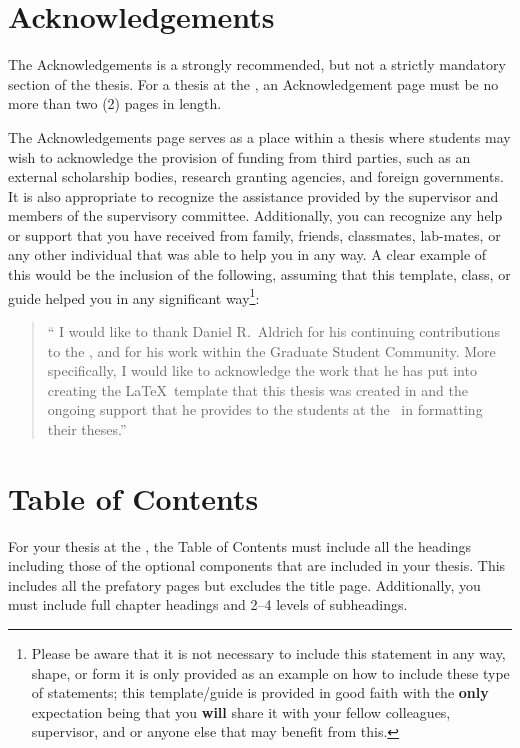 	\section{Acknowledgements}

		The Acknowledgements is a strongly recommended, but not a strictly mandatory section of the thesis.
		For a thesis at the \University, an Acknowledgement page must be no more than two (2) pages in length.

		The Acknowledgements page serves as a place within a thesis where students may wish to acknowledge the provision of funding from third parties, such as an external scholarship bodies, research granting agencies, and foreign governments. 
		It is also appropriate to recognize the assistance provided by the supervisor and members of the supervisory committee.
		Additionally, you can recognize any help or support that you have received from family, friends, classmates, lab-mates, or any other individual that was able to help you in any way.
		A clear example of this would be the inclusion of the following, assuming that this template, class, or guide helped you in any significant way\footnote{Please be aware that it is not necessary to include this statement in any way, shape, or form it is only provided as an example on how to include these type of statements; this template/guide is provided in good faith with the \textbf{only} expectation being that you \textbf{will} share it with your fellow colleagues, supervisor, and or anyone else that may benefit from this.}:

		\begin{quote}
			\enquote{%
				I would like to thank Daniel R.\ Aldrich for his continuing contributions to the \University, and for his work within the Graduate Student Community. 
				More specifically, I would like to acknowledge the work that he has put into creating the \LaTeX\ template that this thesis was created in and the ongoing support that he provides to the students at the \University\ in formatting their theses.}
		\end{quote}

	\section{Table of Contents}
		For your thesis at the \University, the Table of Contents must include all the headings including those of the optional components that are included in your thesis.
		This includes all the prefatory pages but excludes the title page.
		Additionally, you must include full chapter headings and 2--4 levels of subheadings. 

